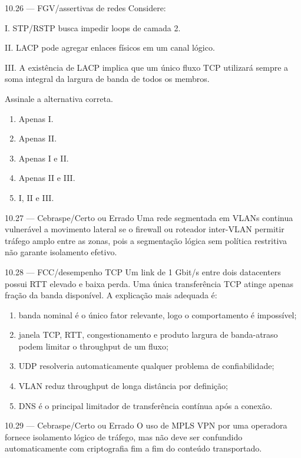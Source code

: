 \begin{questao}{ 10.26 — FGV/assertivas de redes}
Considere:

I. STP/RSTP busca impedir loops de camada 2.

II. LACP pode agregar enlaces físicos em um canal lógico.

III. A existência de LACP implica que um único fluxo TCP utilizará sempre a soma integral da largura de banda de todos os membros.

Assinale a alternativa correta.
\begin{enumerate}[label=\Alph*)]
\item Apenas I.
\item Apenas II.
\item Apenas I e II.
\item Apenas II e III.
\item I, II e III.
\end{enumerate}
\end{questao}

\begin{questao}{ 10.27 — Cebraspe/Certo ou Errado}
Uma rede segmentada em VLANs continua vulnerável a movimento lateral se o firewall ou roteador inter-VLAN permitir tráfego amplo entre as zonas, pois a segmentação lógica sem política restritiva não garante isolamento efetivo.
\end{questao}

\begin{questao}{ 10.28 — FCC/desempenho TCP}
Um link de 1 Gbit/s entre dois datacenters possui RTT elevado e baixa perda. Uma única transferência TCP atinge apenas fração da banda disponível. A explicação mais adequada é:
\begin{enumerate}[label=\Alph*)]
\item banda nominal é o único fator relevante, logo o comportamento é impossível;
\item janela TCP, RTT, congestionamento e produto largura de banda-atraso podem limitar o throughput de um fluxo;
\item UDP resolveria automaticamente qualquer problema de confiabilidade;
\item VLAN reduz throughput de longa distância por definição;
\item DNS é o principal limitador de transferência contínua após a conexão.
\end{enumerate}
\end{questao}

\begin{questao}{ 10.29 — Cebraspe/Certo ou Errado}
O uso de MPLS VPN por uma operadora fornece isolamento lógico de tráfego, mas não deve ser confundido automaticamente com criptografia fim a fim do conteúdo transportado.
\end{questao}

